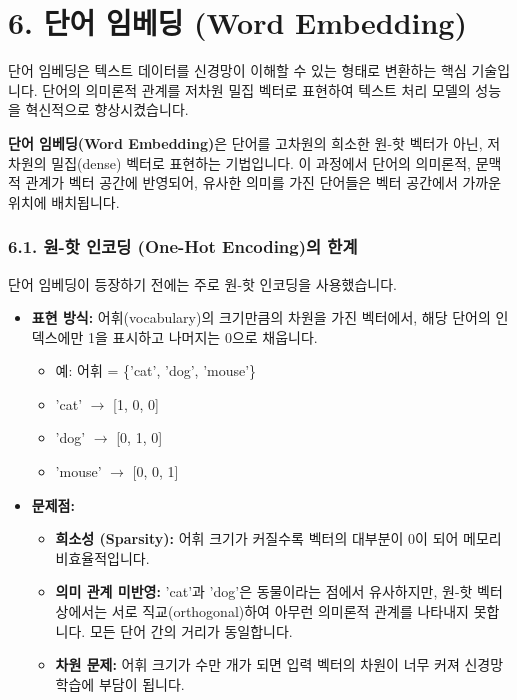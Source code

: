\documentclass[11pt,a4paper]{article}
\theoremstyle{definition}
\newcommand{\newsection}[1]{\newpage\section{#1}}
\begin{document}
\newsection{6. 단어 임베딩 (Word Embedding)}
단어 임베딩은 텍스트 데이터를 신경망이 이해할 수 있는 형태로 변환하는 핵심 기술입니다. 단어의 의미론적 관계를 저차원 밀집 벡터로 표현하여 텍스트 처리 모델의 성능을 혁신적으로 향상시켰습니다.

\begin{tcolorbox}[definitionbox, title=단어 임베딩의 개념]
\textbf{단어 임베딩(Word Embedding)}은 단어를 고차원의 희소한 원-핫 벡터가 아닌, 저차원의 밀집(dense) 벡터로 표현하는 기법입니다.
이 과정에서 단어의 의미론적, 문맥적 관계가 벡터 공간에 반영되어, 유사한 의미를 가진 단어들은 벡터 공간에서 가까운 위치에 배치됩니다.
\end{tcolorbox}

\subsubsection{6.1. 원-핫 인코딩 (One-Hot Encoding)의 한계}
단어 임베딩이 등장하기 전에는 주로 원-핫 인코딩을 사용했습니다.

\begin{itemize}
    \item \textbf{표현 방식:} 어휘(vocabulary)의 크기만큼의 차원을 가진 벡터에서, 해당 단어의 인덱스에만 1을 표시하고 나머지는 0으로 채웁니다.
        \begin{itemize}
            \item 예: 어휘 = \{'cat', 'dog', 'mouse'\}
            \item 'cat' $\rightarrow$ [1, 0, 0]
            \item 'dog' $\rightarrow$ [0, 1, 0]
            \item 'mouse' $\rightarrow$ [0, 0, 1]
        \end{itemize}
    \item \textbf{문제점:}
    \begin{itemize}
        \item \textbf{희소성 (Sparsity):} 어휘 크기가 커질수록 벡터의 대부분이 0이 되어 메모리 비효율적입니다.
        \item \textbf{의미 관계 미반영:} 'cat'과 'dog'은 동물이라는 점에서 유사하지만, 원-핫 벡터 상에서는 서로 직교(orthogonal)하여 아무런 의미론적 관계를 나타내지 못합니다. 모든 단어 간의 거리가 동일합니다.
        \item \textbf{차원 문제:} 어휘 크기가 수만 개가 되면 입력 벡터의 차원이 너무 커져 신경망 학습에 부담이 됩니다.
    \end{itemize}
\end{itemize}
\end{document}
